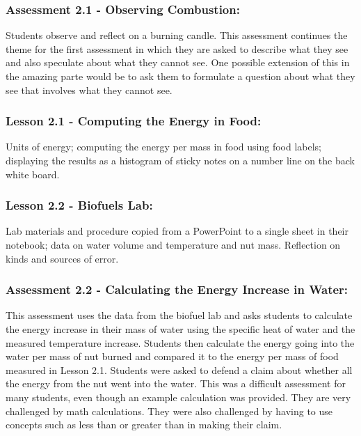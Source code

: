 \documentclass[12pt]{article}
\begin{document}
\subsubsection{Assessment 2.1 - Observing Combustion:}
\label{sec:orgc19bdb6}

Students observe and reflect on a burning candle. This assessment continues the theme for the first assessment in which they are asked to
describe what they see and also speculate about what they cannot see. One possible extension
of this in the amazing parte would be to ask them to formulate a question about what they see
that involves what they cannot see.


\subsubsection{Lesson 2.1 - Computing the Energy in Food:}
\label{sec:orgc8d0d3a}

Units of energy; computing the energy per
mass in food using food labels; displaying the results as a histogram of sticky notes on a
number line on the back white board.


\subsubsection{Lesson 2.2 - Biofuels Lab:}
\label{sec:org600d41b}

Lab materials and procedure copied from a PowerPoint to a
single sheet in their notebook; data on water volume and temperature and nut mass.
Reflection on kinds and sources of error.


\subsubsection{Assessment 2.2 - Calculating the Energy Increase in Water:}
\label{sec:org11efe9c}

This assessment uses the data from the biofuel lab and asks students to calculate the energy increase in their mass of water
using the specific heat of water and the measured temperature increase. Students then
calculate the energy going into the water per mass of nut burned and compared it to the energy
per mass of food measured in Lesson 2.1. Students were asked to defend a claim about
whether all the energy from the nut went into the water. This was a difficult assessment for
many students, even though an example calculation was provided. They are very challenged by
math calculations. They were also challenged by having to use concepts such as less than or
greater than in making their claim.
\end{document}
